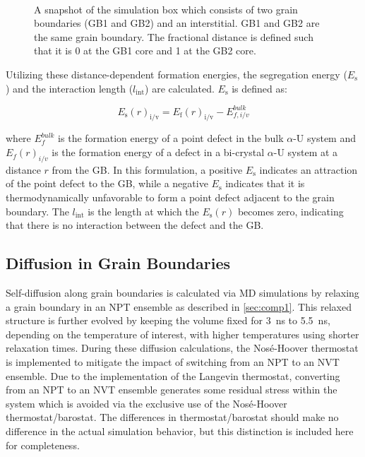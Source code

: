 \documentclass[review]{elsarticle}
\begin{document}
\begin{figure}[h!]
\centering
{}\\
\caption{A snapshot of the simulation box which consists of two grain boundaries (GB1 and GB2) and an interstitial. GB1 and GB2 are the same grain boundary. The fractional distance is defined such that it is 0 at the GB1 core and 1 at the GB2 core.}
\label{fig:GB}
\end{figure}

Utilizing these distance-dependent formation energies, the segregation energy ($E_{\mathrm{s}}$) and the interaction length ($l_{\mathrm{int}}$) are calculated. $E_{\mathrm{s}}$ is defined as:

\begin{equation}
\label{eq:eform2}
E_{\mathrm{s}}(r)_{\mathrm{i/v}} = E_{\mathrm{f}}(r)_{\mathrm{i/v}} - E_{f,i/v}^{bulk}
\end{equation}

\noindent where $E_{f}^{bulk}$ is the formation energy of a point defect in the bulk $\alpha$-U system and $E_f(r)_{i/v}$ is the formation energy of a defect in a bi-crystal $\alpha$-U system at a distance $r$ from the GB. In this formulation, a positive $E_{\mathrm{s}}$ indicates an attraction of the point defect to the GB, while a negative $E_{\mathrm{s}}$ indicates that it is thermodynamically unfavorable to form a point defect adjacent to the grain boundary. The  $l_{\mathrm{int}}$ is the length at which the $E_{\mathrm{s}}(r)$ becomes zero, indicating that there is no interaction between the defect and the GB.  

\subsection{Diffusion in Grain Boundaries}\label{sec:comp2}
\par Self-diffusion along grain boundaries is calculated via MD simulations by relaxing a grain boundary in an NPT ensemble as described in \cref{sec:comp1}. This relaxed structure is further evolved by keeping the volume fixed for 3~ns to 5.5~ns, depending on the temperature of interest, with higher temperatures using shorter relaxation times. During these diffusion calculations, the Nos\'{e}-Hoover thermostat is implemented to mitigate the impact of switching from an NPT to an NVT ensemble. Due to the implementation of the Langevin thermostat, converting from an NPT to an NVT ensemble generates some residual stress within the system which is avoided via the exclusive use of the Nos\'{e}-Hoover thermostat/barostat. The differences in thermostat/barostat should make no difference in the actual simulation behavior, but this distinction is included here for completeness. 
\end{document}
